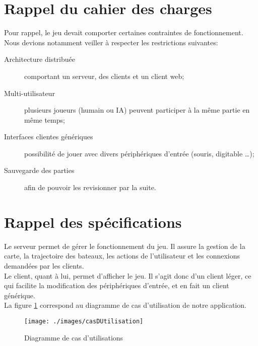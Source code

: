 
\section{Rappel du cahier des charges}

Pour rappel, le jeu devait comporter certaines contraintes de fonctionnement. Nous devions notamment veiller à respecter les restrictions suivantes:
\begin{description}
\item [Architecture distribuée] comportant un serveur, des clients et un client web;
\item[Multi-utilisateur] plusieurs joueurs (humain ou IA) peuvent participer à la même partie en même temps;
\item[Interfaces clientes génériques] possibilité de jouer avec divers périphériques d'entrée (souris, digitable \dots{});
\item[Sauvegarde des parties] afin de pouvoir les revisionner par la suite.
\end{description}

\section{Rappel des spécifications}


Le serveur permet de gérer le fonctionnement du jeu. Il assure la gestion de la carte, la trajectoire des bateaux, les actions de l'utilisateur et les connexions demandées par les clients.\\ 

Le client, quant à lui, permet d'afficher le jeu. Il s'agit donc d'un client léger, ce qui facilite la modification des périphériques d'entrée, et en fait un client générique.\\

La figure \ref{fig:casUtilisation} correspond au diagramme de cas d'utilisation de notre application. 


\begin{figure}[htbp]
  \centering
 \texttt{[image: ./images/casDUtilisation]} 
  \caption{Diagramme de cas d'utilisations}
  \label{fig:casUtilisation}
\end{figure}
